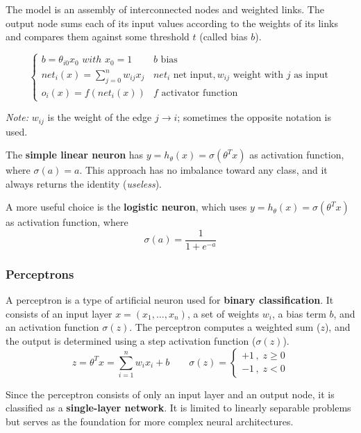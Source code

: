 The model is an assembly of interconnected nodes and weighted links. The output node sums each of its input values according to the weights of its links and compares them against some threshold $t$ (called bias $b$).


\begin{equation*}
    \begin{cases}
        b=\theta_{i0}x_0\,\, with\,\, x_0=1 & b \text{ bias}\\
        net_i(x) = \sum_{j=0}^n w_{ij} x_j & net_i \text{ net input}, w_{ij}\text{ weight with $j$ as input}\\
        o_i(x) = f(net_i(x))& f \text{ activator function}
    \end{cases}
\end{equation*}

\textit{Note:} $w_{ij}$ is the weight of the edge $j\to i$; sometimes the opposite notation is used.

The \textbf{simple linear neuron} has $y=h_\theta(x)=\sigma(\theta^Tx)$ as activation function, where $\sigma(a) = a$.
This approach has no imbalance toward any class, and it always returns the identity (\textit{useless}).

A more useful choice is the \textbf{logistic neuron}, which uses $y=h_\theta(x)=\sigma(\theta^Tx)$ as activation function, where
    \begin{equation}
    \sigma(a)=\dfrac{1}{1+e^{-a}}        
    \end{equation}


\subsubsection{Perceptrons}
A perceptron is a type of artificial neuron used for \textbf{binary classification}. It consists of an input layer $x=(x_1,\dots,x_n)$, a set of weights $w_i$, a bias term $b$, and an activation function $\sigma(z)$. The perceptron computes a weighted sum ($z$), and the output is determined using a step activation function ($\sigma(z)$).
\begin{equation*}
    z = \theta^T x = \sum_{i=1}^{n} w_i x_i + b
\qquad \sigma(z)=
        \begin{cases}
       +1 \,,\; z\geq 0\\
       -1 \,,\; z < 0
    \end{cases}
\end{equation*}

Since the perceptron consists of only an input layer and an output node, it is classified as a \textbf{single-layer network}. It is limited to linearly separable problems but serves as the foundation for more complex neural architectures.

